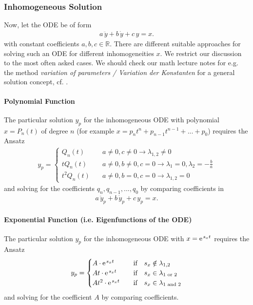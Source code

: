 \documentclass[11pt,a4paper,DIV=12]{scrartcl}
\begin{document}
\subsubsection{Inhomogeneous Solution}
Now, let the ODE be of form
\begin{align}
a \, \ddot{y} + b \, \dot{y} + c \, y = x.
\end{align}
with constant coefficients $a, b, c\in \mathbb{R}$.
%
There are different suitable approaches for solving such an ODE for
different inhomogeneities $x$.
We restrict our discussion to the most often asked cases.
We should check our math lecture notes for e.g. the method
\textit{variation of parameters / Variation der Konstanten} for a general
solution concept, cf. \cite{Burg2013}.

\paragraph{Polynomial Function}
The particular solution $y_p$ for the inhomogeneous ODE with
polynomial $x = P_n(t)$ of degree $n$
(for example $x = p_n t^n + p_{n-1} t^{n-1} + ... +p_0$)
requires the Ansatz
\begin{align}
y_p =
\begin{cases}
Q_n(t)&\quad a\neq 0, c\neq 0 \rightarrow \lambda_{1,2} \neq 0\\
t Q_n(t)&\quad a\neq 0, b\neq 0, c=0 \rightarrow \lambda_1=0,\lambda_2 = -\frac{b}{a}\\
t^2 Q_n(t)&\quad a\neq 0, b=0, c=0  \rightarrow \lambda_{1,2} = 0
\end{cases}
\end{align}
and solving for the coefficients $q_n, q_{n-1},...,q_0$ by comparing
coefficients in
\begin{align}
a \, \ddot{y}_p + b \, \dot{y}_p + c \, y_p = x.
\end{align}

\paragraph{Exponential Function (i.e. Eigenfunctions of the ODE)}
The particular solution $y_p$ for the inhomogeneous ODE with
$x = \e^{s_x t}$
requires the Ansatz
\begin{align}
y_p =
\begin{cases}
A \cdot \e^{s_x t}&\quad \text{if} \quad  s_x \notin \lambda_{1,2}\\
A t \cdot \e^{s_x t}&\quad \text{if} \quad s_x \in \lambda_{1 \text{ or } 2}\\
A t^2 \cdot \e^{s_x t}&\quad \text{if} \quad s_x \in \lambda_{1 \text{ and } 2}
\end{cases}
\end{align}
and solving for the coefficient $A$ by comparing coefficients.
\end{document}
